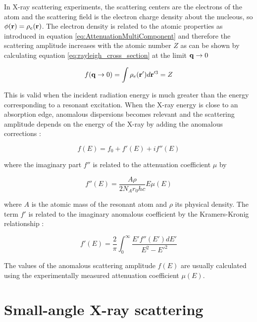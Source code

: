 In X-ray scattering experiments, the scattering centers are the electrons of the atom and the scattering field is the electron charge density about the nucleous, so $\phi(\boldsymbol{\mathbf{r}})=\rho_e(\boldsymbol{\mathbf{r}})$. The electron density is related to the atomic properties as introduced in equation \ref{eq:AttenuationMultiComponent} and therefore the scattering amplitude increases with the atomic number $Z$ as can be shown by calculating equation \ref{eq:rayleigh_cross_section} at the limit $\boldsymbol{\mathbf{q}} \rightarrow 0$

\begin{equation}
        f(\boldsymbol{\mathbf{q}} \rightarrow 0) = \int \rho_e(\boldsymbol{\mathbf{r}}')  d\boldsymbol{\mathbf{r}}'^3 = Z
\end{equation}

This is valid when the incident radiation energy is much greater than the energy corresponding to a resonant excitation. When the X-ray energy is close to an absorption edge, anomalous dispersions becomes relevant and the scattering amplitude depends on the energy of the X-ray by adding the anomalous corrections \citep{als-nielsen_elements_2011}:

\begin{equation}
        f(E) = f_0 + f'(E) + i f'' (E)
\end{equation}

where the imaginary part $f''$ is related to the attenuation coefficient $\mu$ by\citep{feigin_structure_1987}

\begin{equation}
        f'' (E) = \frac{A\rho}{2N_A r_0 h c} E \mu(E)
\end{equation}

where $A$ is the atomic mass of the resonant atom and $\rho$ its physical density. The term $f'$ is related to the imaginary anomalous coefficient by the Kramers-Kronig relationship \citep{de_l._kronig_theory_1926,kramers_diffusion_1927}:

\begin{equation}
        f'(E) = \frac{2}{\pi} \int_0^{\infty} \frac{E'f''(E')dE'}{E^2 - E'^2}
\end{equation}

The values of the anomalous scattering amplitude $f(E)$ are usually calculated using the experimentally measured attenuation coefficient $\mu(E)$.

\section{Small-angle X-ray scattering}
\label{sec:SAXS_theory}

